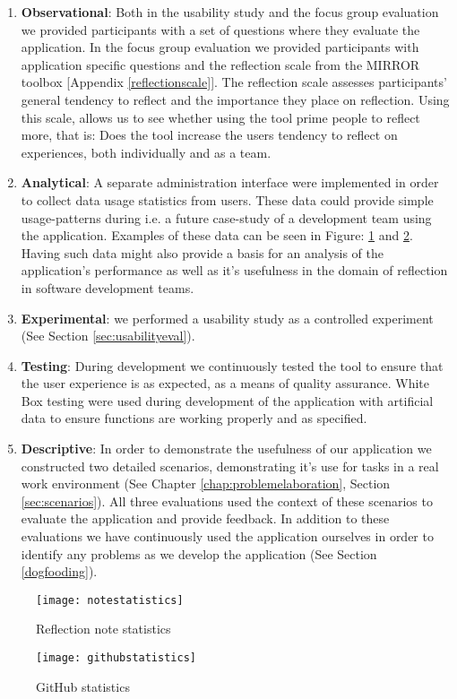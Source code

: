 \begin{enumerate}
	\item \textbf{Observational}: Both in the usability study and the focus group evaluation we provided participants with a set of questions where they evaluate the application. In the focus group evaluation we provided participants with application specific questions and the reflection scale from the MIRROR toolbox [Appendix \ref{reflectionscale}]. The reflection scale assesses participants' general tendency to reflect and the importance they place on reflection. Using this scale, allows us to see whether using the tool prime people to reflect more, that is: Does the tool increase the users tendency to reflect on experiences, both individually and as a team.
	\item \textbf{Analytical}: A separate administration interface were implemented in order to collect data usage statistics from users. These data could provide simple usage-patterns during i.e. a future case-study of a development team using the application. Examples of these data can be seen in Figure: \ref{notestatistics} and  \ref{githubstatistics}. Having such data might also provide a basis for an analysis of the application's performance as well as it's usefulness in the domain of reflection in software development teams. 
	\item \textbf{Experimental}: we performed a usability study as a controlled experiment (See Section \ref{sec:usabilityeval}).
	\item \textbf{Testing}: During development we continuously tested the tool to ensure that the user experience is as expected, as a means of quality assurance. White Box testing were used during development of the application with artificial data to ensure functions are working properly and as specified. 
	\item \textbf{Descriptive}: In order to demonstrate the usefulness of our application we constructed two detailed scenarios, demonstrating it's use for tasks in a real work environment (See Chapter \ref{chap:problemelaboration}, Section \ref{sec:scenarios}). All three evaluations used the context of these scenarios to evaluate the application and provide feedback. In addition to these evaluations we have continuously used the application ourselves in order to identify any problems as we develop the application (See Section \ref{dogfooding}).
\end{enumerate}
\begin{figure}[!htpb]
\centering
	\texttt{[image: notestatistics]}
\caption{Reflection note statistics}
\label{notestatistics}
\end{figure}
\begin{figure}[!htpb]
\centering
	\texttt{[image: githubstatistics]}
\caption{GitHub statistics}
\label{githubstatistics}
\end{figure}

